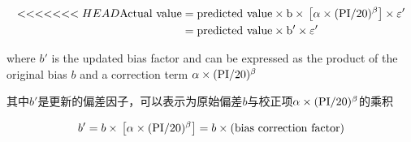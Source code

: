 \begin{align}
        \begin{split}
<<<<<<< HEAD
        \rm{Actual~value}&=\rm{predicted~value}\times{}b\times{}\left[\alpha\times{}(\rm{PI}/20)^\beta\right]\times{}\varepsilon'\\
        &=\rm{predicted~value}\times{}b'\times{}\varepsilon'
    \end{split}
    \label{equation:6}
\end{align}

\begin{paracol}{2}

    where $b'$ is the updated bias factor and can be expressed as the product of the original bias $b$ and a correction term $\alpha\times{}(\rm{PI}/20)^\beta$

    \switchcolumn

    其中$b'$是更新的偏差因子，可以表示为原始偏差$b$与校正项$\alpha\times{}(\rm{PI}/20)^\beta$的乘积
\end{paracol}

\begin{align}
    b'=b\times{}\left[\alpha\times{}(\rm{PI}/20)^\beta\right]=b\times{}(\rm{bias~correction~factor})
    \label{equation:7}
\end{align}
    
